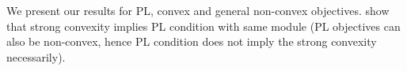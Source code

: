 \documentclass[sigconf, anonymous, review]{acmart}
\begin{document}
We present our results for PL, convex and general non-convex objectives. \citep{karimi2016linear} show that strong convexity implies  PL condition with same module (PL objectives can also be non-convex, hence PL condition does not imply the strong convexity necessarily).



%
%    
\end{document}
